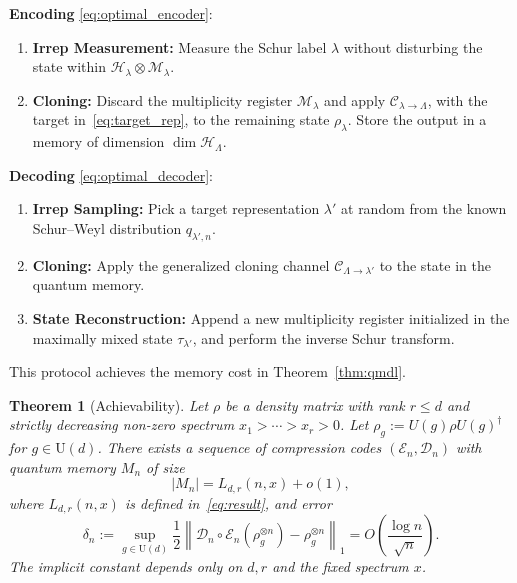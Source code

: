 \documentclass[a4paper,onecolumn,11pt]{quantumarticle}
\newtheorem{thm}{Theorem}
\begin{document}
\begin{tcolorbox}[colback=gray!5!white, colframe=gray!100!black, title=Qudit Compression Scheme]
\textbf{Encoding} \eqref{eq:optimal_encoder}:
\begin{enumerate}
    \item \textbf{Irrep Measurement:} Measure the Schur label $\lambda$ without disturbing the state within $\mathcal H_\lambda\otimes\mathcal M_\lambda$.
    \item \textbf{Cloning:} Discard the multiplicity register $\mathcal{M}_\lambda$ and apply $\mathcal{C}_{\lambda\to \Lambda}$, with the target in~\eqref{eq:target_rep}, to the remaining state $\rho_\lambda$. Store the output in a memory of dimension $\dim\mathcal H_{\Lambda}$.
\end{enumerate}

\textbf{Decoding} \eqref{eq:optimal_decoder}:
\begin{enumerate}
    \item \textbf{Irrep Sampling:} Pick a target representation $\lambda'$ at random from the known Schur--Weyl distribution $q_{\lambda',n}$.
    \item \textbf{Cloning:} Apply the generalized cloning channel $\mathcal{C}_{\Lambda\to \lambda'}$ to the state in the quantum memory.
    \item \textbf{State Reconstruction:} Append a new multiplicity register initialized in the maximally mixed state $\tau_{\lambda'}$, and perform the inverse Schur transform.
\end{enumerate}
\end{tcolorbox}

This protocol achieves the memory cost in Theorem~\ref{thm:qmdl}.
\begin{thm}[Achievability]\label{thm:achievability}
Let $\rho$ be a density matrix with rank $r\le d$ and strictly decreasing non-zero spectrum $x_1>\cdots>x_r>0$. Let $\rho_g:= U(g)\rho U(g)^\dagger$ for $g\in \mathrm U(d)$.
There exists a sequence of compression codes $(\mathcal E_n,\mathcal D_n)$ with quantum memory $M_n$ of size
\[
    |M_n|=L_{d,r}(n,x)+o(1),
\]
where $L_{d,r}(n,x)$ is defined in~\eqref{eq:result}, and error
\[
    \delta_n:= 
    \sup_{g\in \mathrm U(d)}
    \frac12\left\|
        \mathcal D_n\circ \mathcal E_n(\rho_g^{\otimes n}) - \rho_g^{\otimes n}
    \right\|_1
    =O\!\left(\frac{\log n}{\sqrt n}\right).
\]
The implicit constant depends only on $d,r$ and the fixed spectrum $x$.
\end{thm}
\end{document}
